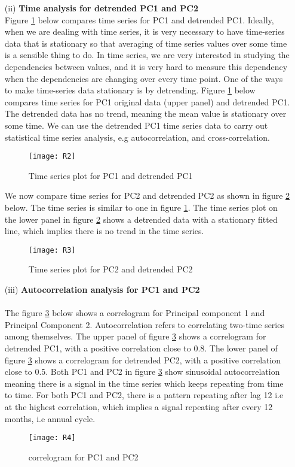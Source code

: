 \documentclass[12pt,a4paper]{article}
\begin{document}
\begin{enumerate}
\item[(ii)]\textbf{Time analysis for detrended PC1 and PC2 }\\
Figure \ref{fig 17} below compares time series for PC1 and detrended PC1. Ideally, when we are dealing with time series, it is very necessary to have time-series data that is stationary so that averaging of time series values over some time is a sensible thing to do. In time series, we are very interested in studying the dependencies between values, and it is very hard to measure this dependency when the dependencies are changing over every time point. One of the ways to make time-series data stationary is by detrending. Figure \ref{fig 17} below compares time series for PC1 original data (upper panel) and detrended PC1. The detrended data has no trend, meaning the mean value is stationary over some time. We can use the detrended PC1 time series data to carry out statistical time series analysis, e.g autocorrelation, and cross-correlation.
\begin{figure}[H]
\texttt{[image: R2]}
\centering
\caption{Time series plot for PC1 and detrended PC1}
\label{fig 17}
\end{figure}
We now compare time series for PC2 and detrended PC2 as shown in figure \ref{fig 18} below. The time series is similar to one in figure \ref{fig 17}. The time series plot on the lower panel in figure \ref{fig 18} shows a detrended data with a stationary fitted line, which implies there is no trend in the time series.
\begin{figure}[H]
\texttt{[image: R3]}
\centering
\caption{Time series plot for PC2 and detrended PC2}
\label{fig 18}
\end{figure}
\newpage
\item[(iii)]\textbf{Autocorrelation analysis for PC1 and PC2}\\ \\
The figure \ref{fig 19} below shows a correlogram for Principal component 1 and Principal Component 2. Autocorrelation refers to correlating two-time series among themselves. The upper panel of figure \ref{fig 19} shows a correlogram for detrended PC1, with a positive correlation close to 0.8. The lower panel of figure \ref{fig 19} shows a correlogram for detrended PC2, with a positive correlation close to 0.5. Both PC1 and PC2 in figure \ref{fig 19} show sinusoidal autocorrelation meaning there is a signal in the time series    
which keeps repeating from time to time. For both PC1 and PC2, there is a pattern repeating after lag 12 i.e at the highest correlation, which implies a signal repeating after every 12 months, i.e annual cycle.
\begin{figure}[H]
\texttt{[image: R4]}
\centering
\caption{correlogram for PC1 and PC2}
\label{fig 19}
\end{figure}


\end{enumerate}
\end{document}
